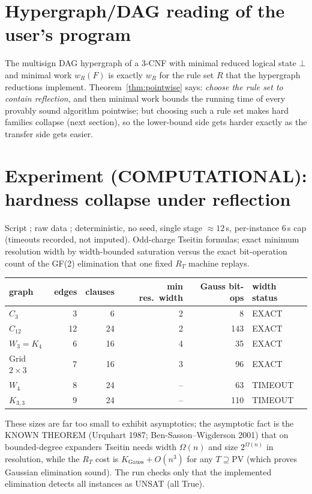 \documentclass[11pt]{article}
\theoremstyle{definition}
\begin{document}
\section{Hypergraph/DAG reading of the user's program}
The multisign DAG hypergraph of a 3-CNF with minimal reduced logical state $\bot$
and minimal work $w_R(F)$ is exactly $w_R$ for the rule set $R$ that the hypergraph
reductions implement. Theorem~\ref{thm:pointwise} says: \emph{choose the rule set to
contain reflection}, and then minimal work bounds the running time of every
provably sound algorithm pointwise; but choosing such a rule set makes hard
families collapse (next section), so the lower-bound side gets harder exactly as
the transfer side gets easier.

\section{Experiment (COMPUTATIONAL): hardness collapse under reflection}
Script ; raw data
;
deterministic, no seed, single stage $\approx12$\,s, per-instance 6\,s cap
(timeouts recorded, not imputed). Odd-charge Tseitin formulas; exact minimum
resolution width by width-bounded saturation versus the exact bit-operation count
of the GF(2) elimination that one fixed $R_T$ machine replays.
\begin{center}
\begin{tabular}{lrrrrl}
\toprule
graph & edges & clauses & min res.\ width & Gauss bit-ops & width status\\
\midrule
$C_3$ & 3 & 6 & 2 & 8 & EXACT\\
$C_{12}$ & 12 & 24 & 2 & 143 & EXACT\\
$W_3=K_4$ & 6 & 16 & 4 & 35 & EXACT\\
Grid $2\times3$ & 7 & 16 & 3 & 96 & EXACT\\
$W_4$ & 8 & 24 & -- & 63 & TIMEOUT\\
$K_{3,3}$ & 9 & 24 & -- & 110 & TIMEOUT\\
\bottomrule
\end{tabular}
\end{center}
These sizes are far too small to exhibit asymptotics; the asymptotic fact is the
KNOWN THEOREM (Urquhart 1987; Ben-Sasson--Wigderson 2001) that on bounded-degree
expanders Tseitin needs width $\Omega(n)$ and size $2^{\Omega(n)}$ in resolution,
while the $R_T$ cost is $K_{\mathrm{Gauss}}+O(n^3)$ for any $T\supseteq\mathrm{PV}$
(which proves Gaussian elimination sound). The run checks only that the
implemented elimination detects all instances as UNSAT (all True).
\end{document}
